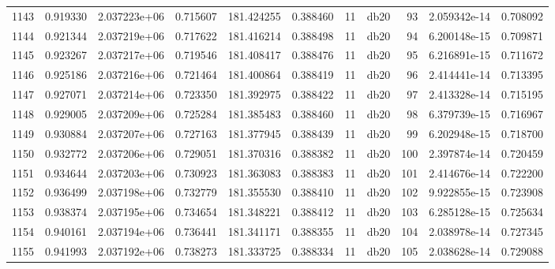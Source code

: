 \begin{tabular}{lrrrrrrlrrr}
1143 &    0.919330 &        2.037223e+06 &  0.715607 &              181.424255 &    0.388460 &      11 &         db20 &     93 &   2.059342e-14 &      0.708092 \\
1144 &    0.921344 &        2.037219e+06 &  0.717622 &              181.416214 &    0.388498 &      11 &         db20 &     94 &   6.200148e-15 &      0.709871 \\
1145 &    0.923267 &        2.037217e+06 &  0.719546 &              181.408417 &    0.388476 &      11 &         db20 &     95 &   6.216891e-15 &      0.711672 \\
1146 &    0.925186 &        2.037216e+06 &  0.721464 &              181.400864 &    0.388419 &      11 &         db20 &     96 &   2.414441e-14 &      0.713395 \\
1147 &    0.927071 &        2.037214e+06 &  0.723350 &              181.392975 &    0.388422 &      11 &         db20 &     97 &   2.413328e-14 &      0.715195 \\
1148 &    0.929005 &        2.037209e+06 &  0.725284 &              181.385483 &    0.388460 &      11 &         db20 &     98 &   6.379739e-15 &      0.716967 \\
1149 &    0.930884 &        2.037207e+06 &  0.727163 &              181.377945 &    0.388439 &      11 &         db20 &     99 &   6.202948e-15 &      0.718700 \\
1150 &    0.932772 &        2.037206e+06 &  0.729051 &              181.370316 &    0.388382 &      11 &         db20 &    100 &   2.397874e-14 &      0.720459 \\
1151 &    0.934644 &        2.037203e+06 &  0.730923 &              181.363083 &    0.388383 &      11 &         db20 &    101 &   2.414676e-14 &      0.722200 \\
1152 &    0.936499 &        2.037198e+06 &  0.732779 &              181.355530 &    0.388410 &      11 &         db20 &    102 &   9.922855e-15 &      0.723908 \\
1153 &    0.938374 &        2.037195e+06 &  0.734654 &              181.348221 &    0.388412 &      11 &         db20 &    103 &   6.285128e-15 &      0.725634 \\
1154 &    0.940161 &        2.037194e+06 &  0.736441 &              181.341171 &    0.388355 &      11 &         db20 &    104 &   2.038978e-14 &      0.727345 \\
1155 &    0.941993 &        2.037192e+06 &  0.738273 &              181.333725 &    0.388334 &      11 &         db20 &    105 &   2.038628e-14 &      0.729088 \\

\end{tabular}
